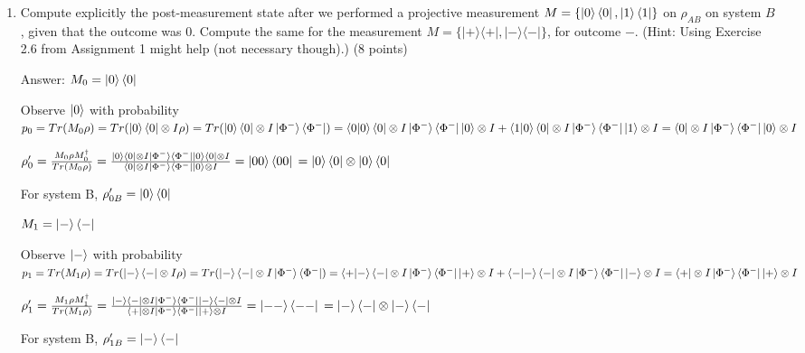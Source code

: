\documentclass{article}
\begin{document}
\begin{enumerate}
    \item Compute explicitly the post-measurement state after we performed a projective measurement $M = \{\ket{0}\bra{0},\ket{1}\bra{1}\}$ on $\rho_{AB}$ on system $B$, given that the outcome was $0$. Compute the same for the measurement $M = \{|+\rangle\langle+|, |-\rangle\langle-|\}$, for outcome $-$. (Hint: Using Exercise 2.6 from Assignment 1 might help (not necessary though).) (8 points)

          Answer: $M_0=\ket{0}\bra{0}$

          Observe $\ket{0}$ with probability $p_0=Tr(M_0\rho)=Tr(\ket{0}\bra{0}\otimes I\rho)=Tr(\ket{0}\bra{0}\otimes I\ket{\Phi^{-}}\bra{\Phi^{-}})=\braket{0|0}\bra{0}\otimes I\ket{\Phi^-}\bra{\Phi^-}\ket{0}\otimes I+\braket{1|0}\bra{0}\otimes I\ket{\Phi^-}\bra{\Phi^-}\ket{1}\otimes I=\bra{0}\otimes I\ket{\Phi^-}\bra{\Phi^-}\ket{0}\otimes I$

          $\rho_0'=\frac{M_0\rho M_0^{\dagger}}{Tr(M_0\rho)}
              \\=\frac{\ket{0}\bra{0}\otimes I\ket{\Phi^{-}}\bra{\Phi^{-}}\ket{0}\bra{0}\otimes I}{\bra{0}\otimes I\ket{\Phi^-}\bra{\Phi^-}\ket{0}\otimes I}
              \\=\ket{00}\bra{00}
              \\=\ket{0}\bra{0}\otimes\ket{0}\bra{0}
          $

          For system B, $\rho_{0B}'=\ket{0}\bra{0}$


          $M_1=\ket{-}\bra{-}$

          Observe $\ket{-}$ with probability $p_1=Tr(M_1\rho)=Tr(\ket{-}\bra{-}\otimes I\rho)=Tr(\ket{-}\bra{-}\otimes I\ket{\Phi^{-}}\bra{\Phi^{-}})=\braket{+|-}\bra{-}\otimes I\ket{\Phi^-}\bra{\Phi^-}\ket{+}\otimes I+\braket{-|-}\bra{-}\otimes I\ket{\Phi^-}\bra{\Phi^-}\ket{-}\otimes I=\bra{+}\otimes I\ket{\Phi^-}\bra{\Phi^-}\ket{+}\otimes I$

          $\rho_1'=\frac{M_1\rho M_1^{\dagger}}{Tr(M_1\rho)}
              \\=\frac{\ket{-}\bra{-}\otimes I\ket{\Phi^{-}}\bra{\Phi^{-}}\ket{-}\bra{-}\otimes I}{\bra{+}\otimes I\ket{\Phi^-}\bra{\Phi^-}\ket{+}\otimes I}
              \\=\ket{--}\bra{--}
              \\=\ket{-}\bra{-}\otimes\ket{-}\bra{-}
          $

          For system B, $\rho_{1B}'=\ket{-}\bra{-}$


\end{enumerate}
\end{document}
